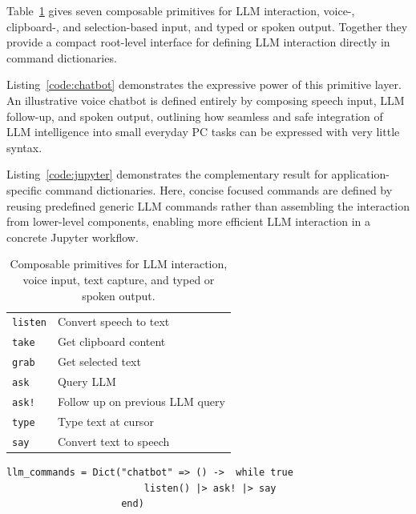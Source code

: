 \documentclass{juliacon}
\begin{document}
Table~\ref{tab:primitives} gives seven composable primitives for LLM interaction, voice-, clipboard-, and selection-based input, and typed or spoken output. Together they provide a compact root-level interface for defining LLM interaction directly in command dictionaries.

Listing~\ref{code:chatbot} demonstrates the expressive power of this primitive layer. An illustrative voice chatbot is defined entirely by composing speech input, LLM follow-up, and spoken output, outlining how seamless and safe integration of LLM intelligence into small everyday PC tasks can be expressed with very little syntax.

Listing~\ref{code:jupyter} demonstrates the complementary result for application-specific command dictionaries. Here, concise focused commands are defined by reusing predefined generic LLM commands rather than assembling the interaction from lower-level components, enabling more efficient LLM interaction in a concrete Jupyter workflow.

\begin{table}[t]
\caption{Composable primitives for LLM interaction, voice input, text capture, and typed or spoken output.}
\label{tab:primitives}
\centering
\footnotesize
\setlength{\tabcolsep}{4pt}
\begin{tabular}{ll}
\hline
\texttt{listen} & Convert speech to text \\
\texttt{take} & Get clipboard content \\
\texttt{grab} & Get selected text \\
\texttt{ask} & Query LLM \\
\texttt{ask!} & Follow up on previous LLM query \\
\texttt{type} & Type text at cursor \\
\texttt{say} & Convert text to speech \\
\hline
\end{tabular}
\end{table}

\begin{lstlisting}[caption={Illustrative voice chatbot composed with the primitives in Table~\ref{tab:primitives}.},label={code:chatbot}]
llm_commands = Dict("chatbot" => () -> 	while true
						listen() |> ask! |> say
					end)
\end{lstlisting}
\end{document}
